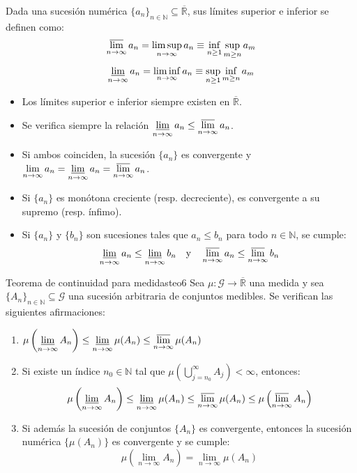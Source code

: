 Dada una sucesión numérica $\{a_n\}_{n \in \mathbb{N}} \subseteq \overline{\mathbb{R}}$, sus límites superior e inferior se definen como:
\[
    \varlimsup_{n \to \infty} a_n = \limsup_{n \to \infty} a_n \equiv \inf_{n \ge 1} \sup_{m \ge n} a_m
\]
\[
    \varliminf_{n \to \infty} a_n = \liminf_{n \to \infty} a_n \equiv \sup_{n \ge 1} \inf_{m \ge n} a_m
\]
\begin{itemize}
    \item Los límites superior e inferior siempre existen en $\overline{\mathbb{R}}$.
    \item Se verifica siempre la relación $\displaystyle \varliminf_{n \to \infty} a_n \le \varlimsup_{n \to \infty} a_n$.
    \item Si ambos coinciden, la sucesión $\{a_n\}$ es convergente y $\displaystyle \lim_{n \to \infty} a_n = \varliminf_{n \to \infty} a_n = \varlimsup_{n \to \infty} a_n$.
    \item Si $\{a_n\}$ es monótona creciente (resp. decreciente), es convergente a su supremo (resp. ínfimo).
    \item Si $\{a_n\}$ y $\{b_n\}$ son sucesiones tales que $a_n \le b_n$ para todo $n \in \mathbb{N}$, se cumple:
    \[
        \varliminf_{n \to \infty} a_n \le \varliminf_{n \to \infty} b_n \quad \text{y} \quad \varlimsup_{n \to \infty} a_n \le \varlimsup_{n \to \infty} b_n
    \]
\end{itemize}

\newpage

\begin{teorema}{Teorema de continuidad para medidas}{teo6}
Sea $\mu : \mathcal{G} \to \overline{\mathbb{R}}$ una medida y sea $\{A_n\}_{n \in \mathbb{N}} \subseteq \mathcal{G}$ una sucesión arbitraria de conjuntos medibles. Se verifican las siguientes afirmaciones:
\begin{enumerate}[label=\alph*)]
    \item $\displaystyle \mu\left( \varliminf_{n \to \infty} A_n \right) \le \varliminf_{n \to \infty} \mu(A_n) \le \varlimsup_{n \to \infty} \mu(A_n)$
    \item Si existe un índice $n_0 \in \mathbb{N}$ tal que $\displaystyle \mu\left( \bigcup_{j=n_0}^\infty A_j \right) < \infty$, entonces:
    \[
        \mu\left( \varliminf_{n \to \infty} A_n \right) \le \varliminf_{n \to \infty} \mu(A_n) \le \varlimsup_{n \to \infty} \mu(A_n) \le \mu\left( \varlimsup_{n \to \infty} A_n \right)
    \]
    \item Si además la sucesión de conjuntos $\{A_n\}$ es convergente, entonces la sucesión numérica $\{\mu(A_n)\}$ es convergente y se cumple:
    \[
        \mu\left( \lim_{n \to \infty} A_n \right) = \lim_{n \to \infty} \mu(A_n)
    \]
\end{enumerate}
\end{teorema}

